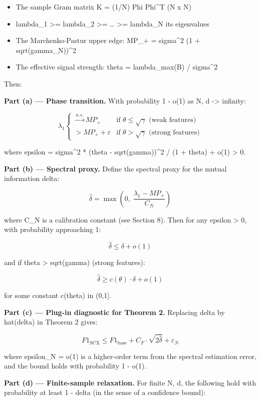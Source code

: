 \documentclass[
  12pt,
]{article}
\providecommand{\tightlist}{%
  \setlength{\itemsep}{0pt}\setlength{\parskip}{0pt}}
\begin{document}
\begin{itemize}
\tightlist
\item
  The sample Gram matrix K = (1/N) Phi Phi\^{}T (N x N)
\item
  lambda\_1 \textgreater= lambda\_2 \textgreater= \ldots{} \textgreater=
  lambda\_N its eigenvalues
\item
  The Marchenko-Pastur upper edge: MP\_+ = sigma\^{}2 (1 +
  sqrt(gamma\_N))\^{}2
\item
  The effective signal strength: theta = lambda\_max(B) / sigma\^{}2
\end{itemize}

Then:

\textbf{Part (a) --- Phase transition.} With probability 1 - o(1) as N,
d -\textgreater{} infinity:

\[\lambda_1 \begin{cases}
\xrightarrow{a.s.} MP_+ & \text{if } \theta \leq \sqrt{\gamma} \text{ (weak features)} \\[4pt]
> MP_+ + \varepsilon & \text{if } \theta > \sqrt{\gamma} \text{ (strong features)}
\end{cases}\]

where epsilon = sigma\^{}2 * (theta - sqrt(gamma))\^{}2 / (1 + theta) +
o(1) \textgreater{} 0.

\textbf{Part (b) --- Spectral proxy.} Define the spectral proxy for the
mutual information delta:

\[\hat{\delta} = \max\left(0,\; \frac{\lambda_1 - MP_+}{C_N}\right)\]

where C\_N is a calibration constant (see Section 8). Then for any
epsilon \textgreater{} 0, with probability approaching 1:

\[\hat{\delta} \leq \delta + o(1)\]

and if theta \textgreater{} sqrt(gamma) (strong features):

\[\hat{\delta} \geq c(\theta) \cdot \delta + o(1)\]

for some constant c(theta) in (0,1{]}.

\textbf{Part (c) --- Plug-in diagnostic for Theorem 2.} Replacing delta
by hat(delta) in Theorem 2 gives:

\[F1_{\text{SCX}} \leq F1_{\text{base}} + C_F \cdot \sqrt{2\hat{\delta}} + \varepsilon_N\]

where epsilon\_N = o(1) is a higher-order term from the spectral
estimation error, and the bound holds with probability 1 - o(1).

\textbf{Part (d) --- Finite-sample relaxation.} For finite N, d, the
following hold with probability at least 1 - delta (in the sense of a
confidence bound):
\end{document}
